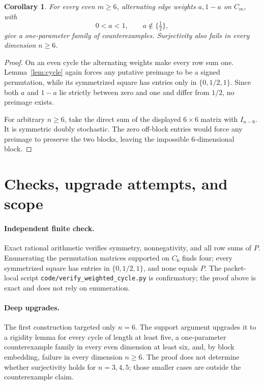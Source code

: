 \documentclass[11pt]{article}
\newtheorem{corollary}[theorem]{Corollary}
\begin{document}
\begin{corollary}\label{cor:family}
For every even \(m\ge6\), alternating edge weights \(a,1-a\) on \(C_m\),
with
\[
 0<a<1,
 \qquad
 a\notin\{\tfrac12\},
\]
give a one-parameter family of counterexamples. Surjectivity also fails in
every dimension \(n\ge6\).
\end{corollary}

\begin{proof}
On an even cycle the alternating weights make every row sum one.
Lemma~\ref{lem:cycle} again forces any putative preimage to be a signed
permutation, while its symmetrized square has entries only in
\(\{0,1/2,1\}\). Since both \(a\) and \(1-a\) lie strictly between zero and
one and differ from \(1/2\), no preimage exists.

For arbitrary \(n\ge6\), take the direct sum of the displayed \(6\times6\)
matrix with \(I_{n-6}\). It is symmetric doubly stochastic. The zero
off-block entries would force any preimage to preserve the two blocks,
leaving the impossible 6-dimensional block.
\end{proof}

\section{Checks, upgrade attempts, and scope}

\paragraph{Independent finite check.}
Exact rational arithmetic verifies symmetry, nonnegativity, and all row sums
of \(P\). Enumerating the permutation matrices supported on \(C_6\) finds
four; every symmetrized square has entries in
\(\{0,1/2,1\}\), and none equals \(P\). The packet-local script
\texttt{code/verify\_weighted\_cycle.py} is confirmatory; the proof above is
exact and does not rely on enumeration.

\paragraph{Deep upgrades.}
The first construction targeted only \(n=6\). The support argument upgrades
it to a rigidity lemma for every cycle of length at least five, a
one-parameter counterexample family in every even dimension at least six,
and, by block embedding, failure in every dimension \(n\ge6\). The proof
does not determine whether surjectivity holds for \(n=3,4,5\); those smaller
cases are outside the counterexample claim.
\end{document}

